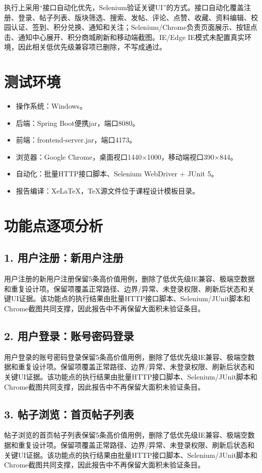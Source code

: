 \documentclass[UTF8,zihao=-4]{ctexart}
\begin{document}
执行上采用“接口自动化优先，Selenium验证关键UI”的方式。接口自动化覆盖注册、登录、帖子列表、版块筛选、搜索、发帖、评论、点赞、收藏、资料编辑、校园认证、签到、积分兑换、通知和关注；Selenium/Chrome负责页面展示、按钮点击、通知中心展开、积分商城刷新和移动端截图。IE/Edge IE模式未配置真实环境，因此相关低优先级兼容项已删除，不写成通过。

\section{测试环境}
\begin{itemize}
\item 操作系统：Windows。
\item 后端：Spring Boot便携jar，端口8080。
\item 前端：frontend-server.jar，端口4173。
\item 浏览器：Google Chrome，桌面视口1440×1000，移动端视口390×844。
\item 自动化：批量HTTP接口脚本、Selenium WebDriver + JUnit 5。
\item 报告编译：XeLaTeX，TeX源文件位于课程设计模板目录。
\end{itemize}

\section{功能点逐项分析}
\subsection{1. 用户注册：新用户注册}
用户注册的新用户注册保留5条高价值用例，删除了低优先级IE兼容、极端空数据和重复设计项。保留项覆盖正常路径、边界/异常、未登录权限、刷新后状态和关键UI证据。该功能点的执行结果由批量HTTP接口脚本、Selenium/JUnit脚本和Chrome截图共同支撑，因此报告中不再保留大面积未验证条目。

\subsection{2. 用户登录：账号密码登录}
用户登录的账号密码登录保留5条高价值用例，删除了低优先级IE兼容、极端空数据和重复设计项。保留项覆盖正常路径、边界/异常、未登录权限、刷新后状态和关键UI证据。该功能点的执行结果由批量HTTP接口脚本、Selenium/JUnit脚本和Chrome截图共同支撑，因此报告中不再保留大面积未验证条目。

\subsection{3. 帖子浏览：首页帖子列表}
帖子浏览的首页帖子列表保留5条高价值用例，删除了低优先级IE兼容、极端空数据和重复设计项。保留项覆盖正常路径、边界/异常、未登录权限、刷新后状态和关键UI证据。该功能点的执行结果由批量HTTP接口脚本、Selenium/JUnit脚本和Chrome截图共同支撑，因此报告中不再保留大面积未验证条目。
\end{document}
